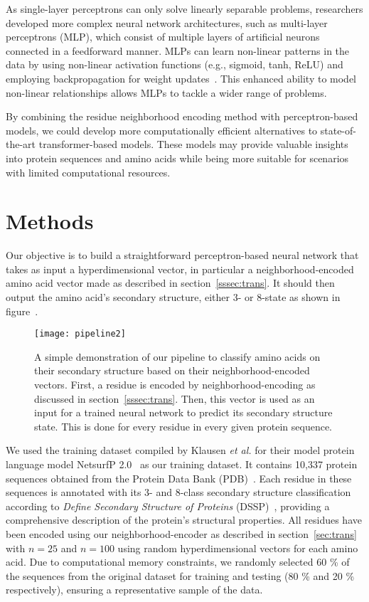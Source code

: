 As single-layer perceptrons can only solve linearly separable problems, researchers developed more complex neural network architectures, such as multi-layer perceptrons (MLP), which consist of multiple layers of artificial neurons connected in a feedforward manner. MLPs can learn non-linear patterns in the data by using non-linear activation functions (e.g., sigmoid, tanh, ReLU) and employing backpropagation for weight updates~\cite{mlp}. This enhanced ability to model non-linear relationships allows MLPs to tackle a wider range of problems.

By combining the residue neighborhood encoding method with perceptron-based models, we could develop more computationally efficient alternatives to state-of-the-art transformer-based models. These models may provide valuable insights into protein sequences and amino acids while being more suitable for scenarios with limited computational resources. 

\section{Methods}
Our objective is to build a straightforward perceptron-based neural network that takes as input a hyperdimensional vector, in particular a neighborhood-encoded amino acid vector made as described in section~\ref{sssec:trans}. It should then output the amino acid's secondary structure, either 3- or 8-state as shown in figure~\cite{fig:pipe2}.

\begin{figure}[H]
    \centering
    \texttt{[image: pipeline2]}
    \caption{A simple demonstration of our pipeline to classify amino acids on their secondary structure based on their neighborhood-encoded vectors. First, a residue is encoded by neighborhood-encoding as discussed in section~\ref{sssec:trans}. Then, this vector is used as an input for a trained neural network to predict its secondary structure state. This is done for every residue in every given protein sequence.}\label{fig:pipe2}
\end{figure}

We used the training dataset compiled by Klausen \textit{et al.} for their model protein language model NetsurfP 2.0~\cite{netsurf} as our training dataset. It contains 10,337 protein sequences obtained from the Protein Data Bank (PDB)~\cite{pdb}. Each residue in these sequences is annotated with its 3- and 8-class secondary structure classification according to \textit{Define Secondary Structure of Proteins} (DSSP)~\cite{dssp}, providing a comprehensive description of the protein's structural properties. All residues have been encoded using our neighborhood-encoder as described in section~\ref{sec:trans} with $n=25$ and $n=100$ using random hyperdimensional vectors for each amino acid. Due to computational memory constraints, we randomly selected 60 \% of the sequences from the original dataset for training and testing (80 \% and 20 \% respectively), ensuring a representative sample of the data.

